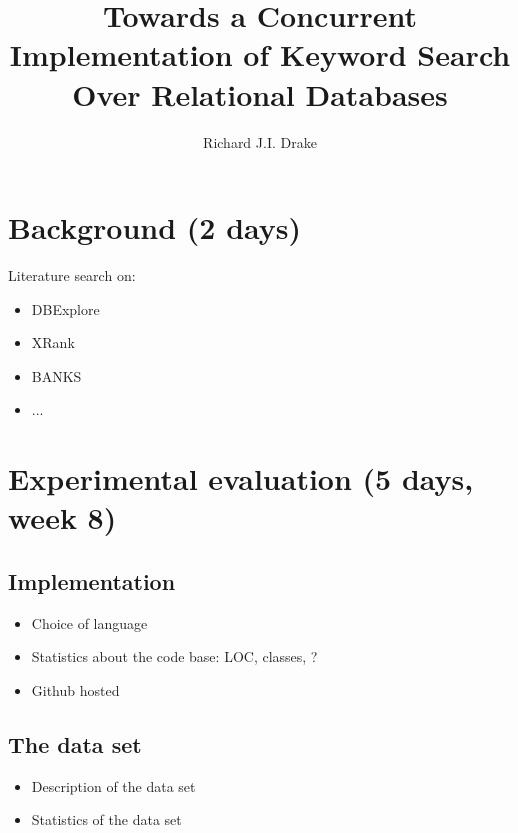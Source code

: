\documentclass[grad]{uoit-thesis}
\author{Richard J.I. Drake}
\title{Towards a Concurrent Implementation of Keyword Search Over Relational Databases}
\begin{document}
	
	
	
	\begin{preliminary}
		\maketitle

		\setcounter{page}{3}

		\tableofcontents

		\listoftables
		\listoffigures
		\listofalgorithms
		\printglossaries
	\end{preliminary}
	
	\chapter{Background (2 days)}
		Literature search on:

		\begin{itemize}
			\item DBExplore
			\item XRank
			\item BANKS
			\item ...
		\end{itemize}
	
	
	
	
	
	

	\chapter{Experimental evaluation (5 days, week 8)}
		\section{Implementation}
			\begin{itemize}
				\item Choice of language
				\item Statistics about the code base: LOC, classes, ?
				\item Github hosted
			\end{itemize}

		\section{The data set}
			\begin{itemize}
				\item Description of the data set
				\item Statistics of the data set
			\end{itemize}
\end{document}
